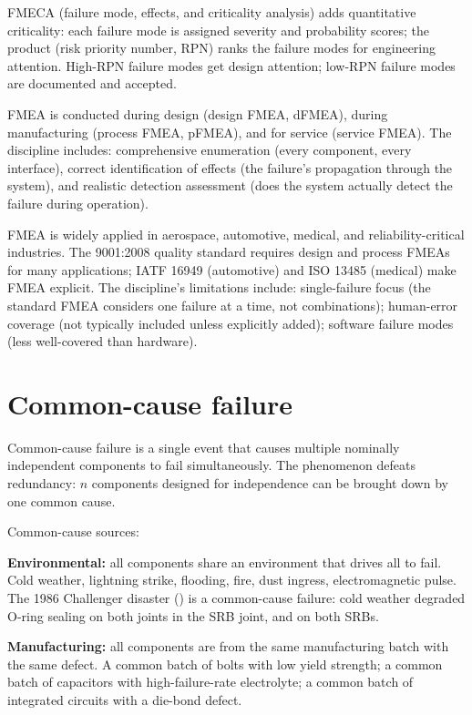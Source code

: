 FMECA (failure mode, effects, and criticality analysis) adds quantitative criticality: each failure mode is assigned severity and probability scores; the product (risk priority number, RPN) ranks the failure modes for engineering attention. High-RPN failure modes get design attention; low-RPN failure modes are documented and accepted.

FMEA is conducted during design (design FMEA, dFMEA), during manufacturing (process FMEA, pFMEA), and for service (service FMEA). The discipline includes: comprehensive enumeration (every component, every interface), correct identification of effects (the failure's propagation through the system), and realistic detection assessment (does the system actually detect the failure during operation).

FMEA is widely applied in aerospace, automotive, medical, and reliability-critical industries. The 9001:2008 quality standard requires design and process FMEAs for many applications; IATF 16949 (automotive) and ISO 13485 (medical) make FMEA explicit. The discipline's limitations include: single-failure focus (the standard FMEA considers one failure at a time, not combinations); human-error coverage (not typically included unless explicitly added); software failure modes (less well-covered than hardware).

\section{Common-cause failure}

Common-cause failure is a single event that causes multiple nominally independent components to fail simultaneously. The phenomenon defeats redundancy: $n$ components designed for independence can be brought down by one common cause.

Common-cause sources:

\textbf{Environmental:} all components share an environment that drives all to fail. Cold weather, lightning strike, flooding, fire, dust ingress, electromagnetic pulse. The 1986 Challenger disaster (\cite{acc:nasa-challenger}) is a common-cause failure: cold weather degraded O-ring sealing on both joints in the SRB joint, and on both SRBs.

\textbf{Manufacturing:} all components are from the same manufacturing batch with the same defect. A common batch of bolts with low yield strength; a common batch of capacitors with high-failure-rate electrolyte; a common batch of integrated circuits with a die-bond defect.

